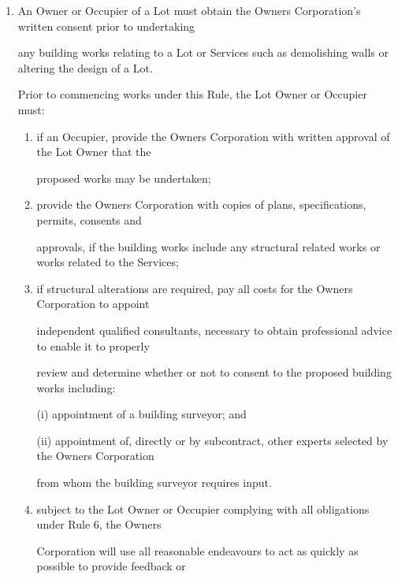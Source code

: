 \documentclass{article}
\begin{document}
\begin{enumerate}[label=\arabic*.]
\begin{enumerate}[label=\arabic{enumi}.\arabic*.]
\begin{enumerate}[label=(\arabic*)]
\item {\fontsize{9.962}{1} An Owner or Occupier of a Lot must obtain the Owners Corporation’s written consent prior to undertaking }

{\fontsize{10.02}{1}any building works relating to a Lot or Services such as demolishing walls or altering the design of a Lot. }

{\fontsize{10.02}{1}Prior to commencing works under this Rule, the Lot Owner or Occupier must: }

\begin{enumerate}[label=(\alph*)]
\item {\fontsize{9.962}{1} if an Occupier, provide the Owners Corporation with written approval of the Lot Owner that the }

{\fontsize{10.02}{1}proposed works may be undertaken; }

\item {\fontsize{9.962}{1} provide the Owners Corporation with copies of plans, specifications, permits, consents and }

{\fontsize{10.02}{1}approvals, if the building works include any structural related works or works related to the Services; }

\item {\fontsize{9.962}{1} if structural alterations are required, pay all costs for the Owners Corporation to appoint }

{\fontsize{10.02}{1}independent qualified consultants, necessary to obtain professional advice to enable it to properly }

{\fontsize{10.02}{1}review and determine whether or not to consent to the proposed building works including: }

{\fontsize{9.962}{1}(i) appointment of a building surveyor; and }

{\fontsize{9.962}{1}(ii) appointment of, directly or by subcontract, other experts selected by the Owners Corporation }

{\fontsize{10.02}{1}from whom the building surveyor requires input. }

\item {\fontsize{9.962}{1} subject to the Lot Owner or Occupier complying with all obligations under Rule 6, the Owners }

{\fontsize{10.02}{1}Corporation will use all reasonable endeavours to act as quickly as possible to provide feedback or }


\end{enumerate}
\end{enumerate}
\end{enumerate}
\end{enumerate}
\end{document}
